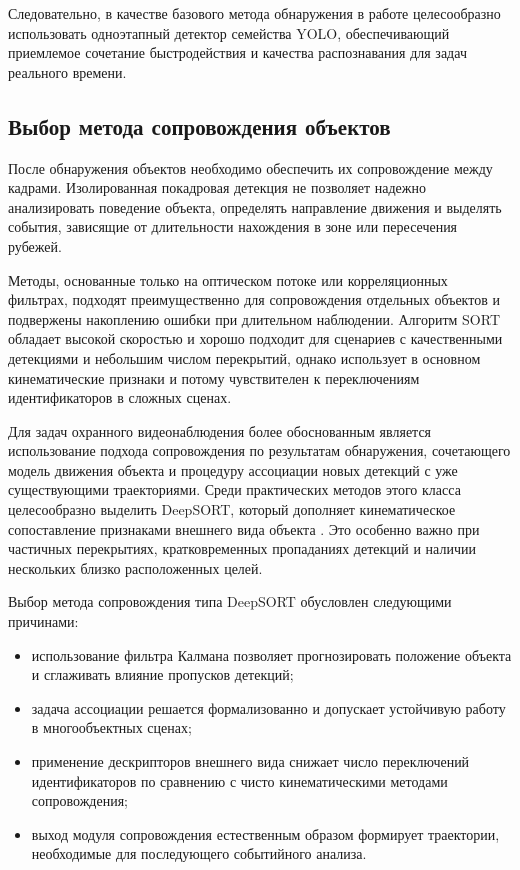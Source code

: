 Следовательно, в качестве базового метода обнаружения в работе целесообразно использовать одноэтапный детектор семейства YOLO, обеспечивающий приемлемое сочетание быстродействия и качества распознавания для задач реального времени.

\subsection{Выбор метода сопровождения объектов}

После обнаружения объектов необходимо обеспечить их сопровождение между кадрами. Изолированная покадровая детекция не позволяет надежно анализировать поведение объекта, определять направление движения и выделять события, зависящие от длительности нахождения в зоне или пересечения рубежей.

Методы, основанные только на оптическом потоке или корреляционных фильтрах, подходят преимущественно для сопровождения отдельных объектов и подвержены накоплению ошибки при длительном наблюдении. Алгоритм SORT обладает высокой скоростью и хорошо подходит для сценариев с качественными детекциями и небольшим числом перекрытий, однако использует в основном кинематические признаки и потому чувствителен к переключениям идентификаторов в сложных сценах.

Для задач охранного видеонаблюдения более обоснованным является использование подхода сопровождения по результатам обнаружения, сочетающего модель движения объекта и процедуру ассоциации новых детекций с уже существующими траекториями. Среди практических методов этого класса целесообразно выделить DeepSORT, который дополняет кинематическое сопоставление признаками внешнего вида объекта \cite{bewley2016sort,wojke2017deepsort}. Это особенно важно при частичных перекрытиях, кратковременных пропаданиях детекций и наличии нескольких близко расположенных целей.

Выбор метода сопровождения типа DeepSORT обусловлен следующими причинами:
\begin{itemize}
    \item использование фильтра Калмана позволяет прогнозировать положение объекта и сглаживать влияние пропусков детекций;
    \item задача ассоциации решается формализованно и допускает устойчивую работу в многообъектных сценах;
    \item применение дескрипторов внешнего вида снижает число переключений идентификаторов по сравнению с чисто кинематическими методами сопровождения;
    \item выход модуля сопровождения естественным образом формирует траектории, необходимые для последующего событийного анализа.
\end{itemize}

